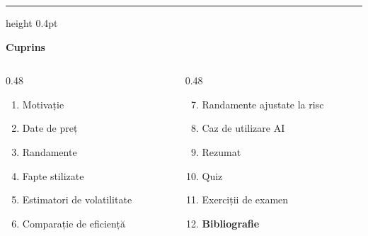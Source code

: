 \documentclass[9pt, aspectratio=169, t]{beamer}
\theoremstyle{definition}
\begin{document}
{
\begin{frame}{}
    {\color{FooterGray}\hrule height 0.4pt}
    \vspace{0.1cm}
    {\Large\textcolor{IDAred}{\textbf{Cuprins}}}
    \vspace{0.2cm}
    {\small
    \begin{columns}[T]
        \begin{column}{0.48\textwidth}
            \begin{enumerate}
                \item Motivație \checkmark
                \item Date de preț \checkmark
                \item Randamente \checkmark
                \item Fapte stilizate \checkmark
                \item Estimatori de volatilitate \checkmark
                \item Comparație de eficiență \checkmark
            \end{enumerate}
        \end{column}
        \begin{column}{0.48\textwidth}
            \begin{enumerate}\setcounter{enumi}{6}
                \item Randamente ajustate la risc \checkmark
                \item Caz de utilizare AI \checkmark
                \item Rezumat \checkmark
                \item Quiz \checkmark
                \item Exerciții de examen \checkmark
                \item \textbf{Bibliografie}
            \end{enumerate}
        \end{column}
    \end{columns}
    }
\end{frame}
}

\end{document}
